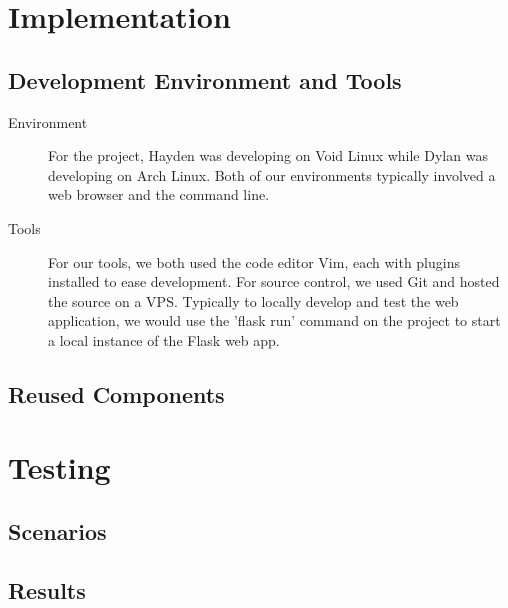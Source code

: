\documentclass[12pt]{article}
\begin{document}
\section{Implementation}
\subsection{Development Environment and Tools}
\begin{description}
	\item[Environment] For the project, Hayden was developing on Void Linux while Dylan was developing on Arch Linux. Both of our environments typically involved a web browser and the command line.
	\item[Tools] For our tools, we both used the code editor Vim, each with plugins installed to ease development. For source control, we used Git and hosted the source on a VPS. Typically to locally develop and test the web application, we would use the 'flask run' command on the project to start a local instance of the Flask web app.
\end{description}
\subsection{Reused Components}

\section{Testing}
\subsection{Scenarios}
\subsection{Results}
\end{document}

